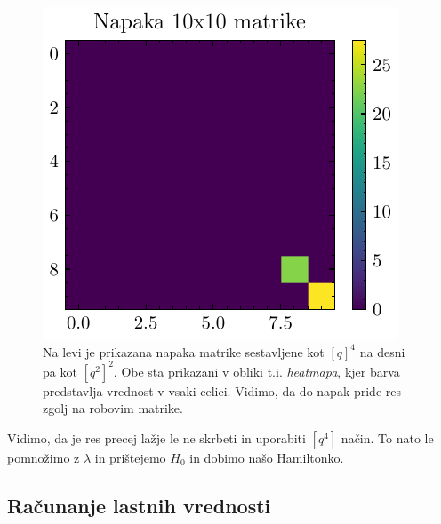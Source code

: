 \documentclass[slovene,11pt,a4paper]{article}
\begin{document}
\begin{figure}[ht]
\begin{minipage}{0.48\textwidth}
  \end{minipage}%
  \hfill%
  \begin{minipage}{0.48\textwidth}
    \centering
    \includegraphics[width=\linewidth]{graphs/err2.pdf}
    
  \end{minipage}
  \caption{Na levi je prikazana napaka matrike sestavljene kot $\left[q\right]^4$ na desni pa kot $\left[q^2\right]^2$. Obe sta prikazani v obliki t.i. \textit{heatmapa}, kjer barva predstavlja vrednost v vsaki celici. Vidimo, da do napak pride res zgolj na robovim matrike.}
  \label{fig: robni defekt}
\end{figure}

Vidimo, da je res precej lažje le ne skrbeti in uporabiti $\left[q^4\right]$ način. To nato le pomnožimo z $\lambda$ in prištejemo $H_0$ in dobimo našo Hamiltonko.
\bigskip
\bigskip
\bigskip

\subsection{Računanje lastnih vrednosti}
\end{document}
